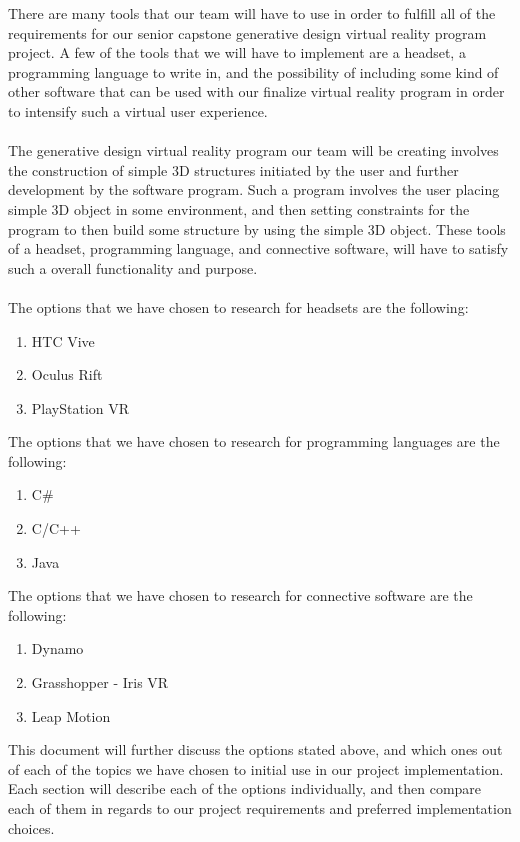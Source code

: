 \documentclass[letterpaper,10pt,onecolumn,compsoc]{IEEEtran}
\begin{document}
\noindent
There are many tools that our team will have to use in order to fulfill all of the requirements for our senior capstone generative design virtual reality program project. A few of the tools that we will have to implement are a headset, a programming language to write in, and the possibility of including some kind of other software that can be used with our finalize virtual reality program in order to intensify such a virtual user experience. 
\\ ~ \\ \noindent
The generative design virtual reality program our team will be creating involves the construction of simple 3D structures initiated by the user and further development by the software program. Such a program involves the user placing simple 3D object in some environment, and then setting constraints for the program to then build some structure by using the simple 3D object. These tools of a headset, programming language, and connective software, will have to satisfy such a overall functionality and purpose. 
\\ ~ \\
The options that we have chosen to research for headsets are the following:
\begin{enumerate}
 	\item HTC Vive
 	\item Oculus Rift
 	\item PlayStation VR
\end{enumerate}
\noindent
The options that we have chosen to research for programming languages are the following:
\begin{enumerate}
 	\item C\#
 	\item C/C++
 	\item Java
\end{enumerate}
\noindent
The options that we have chosen to research for connective software are the following:
\begin{enumerate}
 	\item Dynamo
 	\item Grasshopper - Iris VR
 	\item Leap Motion
\end{enumerate}
\noindent
This document will further discuss the options stated above, and which ones out of each of the topics we have chosen to initial use in our project implementation. Each section will describe each of the options individually, and then compare each of them in regards to our project requirements and preferred implementation choices.
\end{document}
